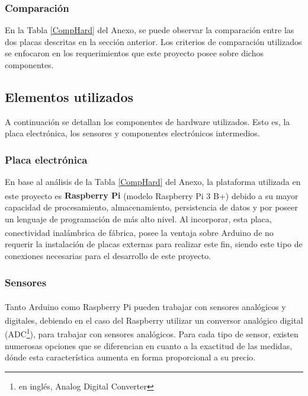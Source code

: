             \subsubsection{Comparación}
                \par En la Tabla \ref{CompHard} del Anexo, se puede observar la comparación entre las dos placas descritas en la sección anterior. Los criterios de comparación utilizados se enfocaron en los requerimientos que este proyecto posee sobre dichos componentes.
        
    \subsection{Elementos utilizados}
    \label{subseccionElementosutilizados}
        \par A continuación se detallan los componentes de hardware utilizados. Esto es, la placa electrónica, los sensores y componentes electrónicos intermedios.
        
        \subsubsection{Placa electrónica}
            \par En base al análisis de la Tabla \ref{CompHard} del Anexo, la plataforma utilizada en este proyecto es \textbf{Raspberry\textsuperscript{\textregistered} Pi} (modelo Raspberry\textsuperscript{\textregistered} Pi 3 B+) debido a su mayor capacidad de procesamiento, almacenamiento, persistencia de datos y por poseer un lenguaje de programación de más alto nivel. Al incorporar, esta placa, conectividad inalámbrica de fábrica, posee la ventaja sobre Arduino\textsuperscript{\textregistered} de no requerir la instalación de placas externas para realizar este fin, siendo este tipo de conexiones necesarias para el desarrollo de este proyecto. 

        \subsubsection{Sensores}
            \par Tanto Arduino\textsuperscript{\textregistered} como Raspberry\textsuperscript{\textregistered} Pi pueden trabajar con sensores analógicos y digitales, debiendo en el caso del Raspberry\textsuperscript{\textregistered} utilizar un conversor analógico digital (ADC\footnote{en inglés, Analog Digital Converter}), para trabajar con sensores analógicos. Para cada tipo de sensor, existen numerosas opciones que se diferencian en cuanto a la exactitud de las medidas, dónde esta característica aumenta en forma proporcional a su precio.
            

